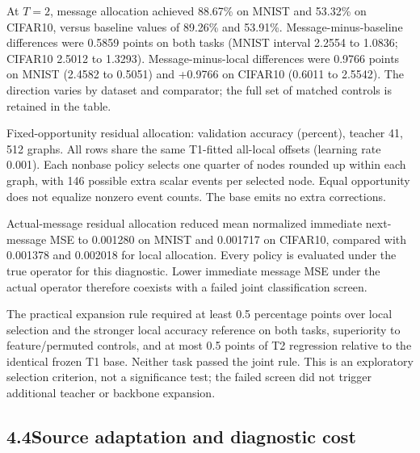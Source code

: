 \documentclass[11pt]{article}
\begin{document}
At $T=2$, message allocation achieved 88.67\% on MNIST and 53.32\% on CIFAR10, versus baseline values of 89.26\% and 53.91\%. Message-minus-baseline differences were \textminus{}0.5859 points on both tasks (MNIST interval \textminus{}2.2554 to 1.0836; CIFAR10 \textminus{}2.5012 to 1.3293). Message-minus-local differences were \textminus{}0.9766 points on MNIST (\textminus{}2.4582 to 0.5051) and +0.9766 on CIFAR10 (\textminus{}0.6011 to 2.5542). The direction varies by dataset and comparator; the full set of matched controls is retained in the table.

\begin{table}[!htbp]
\centering
\small
\caption{Fixed-opportunity residual allocation: validation accuracy (percent), teacher 41, 512 graphs. All rows share the same T1-fitted all-local offsets (learning rate 0.001). Each nonbase policy selects one quarter of nodes rounded up within each graph, with 146 possible extra scalar events per selected node. Equal opportunity does not equalize nonzero event counts. The base emits no extra corrections.}
\label{tab:allocation}
\begin{adjustbox}{max width=\linewidth}\end{adjustbox}
\end{table}

Actual-message residual allocation reduced mean normalized immediate next-message MSE to 0.001280 on MNIST and 0.001717 on CIFAR10, compared with 0.001378 and 0.002018 for local allocation. Every policy is evaluated under the true operator for this diagnostic. Lower immediate message MSE under the actual operator therefore coexists with a failed joint classification screen.

The practical expansion rule required at least 0.5 percentage points over local selection and the stronger local accuracy reference on both tasks, superiority to feature/permuted controls, and at most 0.5 points of T2 regression relative to the identical frozen T1 base. Neither task passed the joint rule. This is an exploratory selection criterion, not a significance test; the failed screen did not trigger additional teacher or backbone expansion.

\subsection*{4.4\quad Source adaptation and diagnostic cost}
\end{document}
